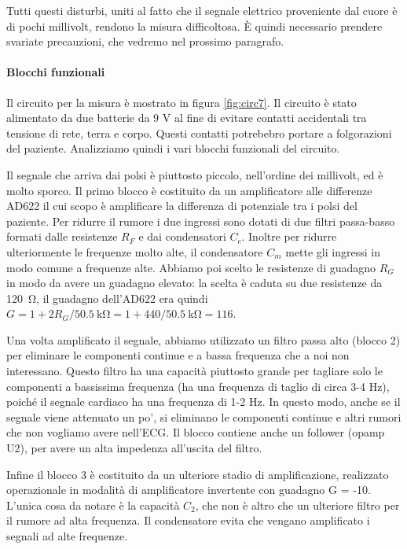 Tutti questi disturbi, uniti al fatto che il segnale elettrico proveniente dal cuore è di pochi
millivolt, rendono la misura difficoltosa. È quindi necessario prendere svariate precauzioni, che vedremo nel
prossimo paragrafo.

\paragraph{Blocchi funzionali}

Il circuito per la misura è mostrato in figura \ref{fig:circ7}. Il circuito è stato alimentato da due batterie da
9 V al fine di evitare contatti accidentali tra tensione di rete, terra e corpo. Questi contatti potrebebro portare
a folgorazioni del paziente. Analizziamo quindi i vari blocchi funzionali del circuito.

Il segnale che arriva dai polsi è piuttosto piccolo, nell'ordine dei millivolt, ed è molto sporco.
Il primo blocco è costituito da un amplificatore alle differenze AD622 il cui scopo è amplificare
la differenza di potenziale tra i polsi del paziente. Per ridurre il rumore i due ingressi sono dotati
di due filtri passa-basso formati dalle resistenze $R_F$ e dai condensatori $C_c$. Inoltre per ridurre
ulteriormente le frequenze molto alte, il condensatore $C_m$ mette gli ingressi in modo comune
a frequenze alte. Abbiamo poi scelto le resistenze di guadagno $R_G$ in modo da avere un guadagno elevato:
la scelta è caduta su due resistenze da \SI{120}{\ohm}, il guadagno dell'AD622 era quindi
$G = 1 + 2R_G/\SI{50.5}{\kilo\ohm} = 1 + 440/\SI{50.5}{\kilo\ohm} = 116$. 

Una volta amplificato il segnale, abbiamo utilizzato un filtro passa alto (blocco 2)
per eliminare le componenti continue e a bassa frequenza che a noi non interessano.
Questo filtro ha una capacità piuttosto grande per tagliare solo le componenti a bassissima frequenza
(ha una frequenza di taglio di circa 3-4 Hz), poiché il segnale cardiaco ha una frequenza di 1-2 Hz.
In questo modo, anche se il segnale viene attenuato un po', si eliminano le componenti continue e altri rumori
che non vogliamo avere nell'ECG. Il blocco contiene anche un follower (opamp U2),
per avere un alta impedenza all'uscita del filtro.

Infine il blocco 3 è costituito da un ulteriore stadio di amplificazione, realizzato operazionale in modalità
di amplificatore invertente con guadagno G = -10. L'unica cosa da notare è la capacità $C_2$, che non è altro che un ulteriore
filtro per il rumore ad alta frequenza. Il condensatore evita che vengano amplificato i segnali ad alte frequenze.

